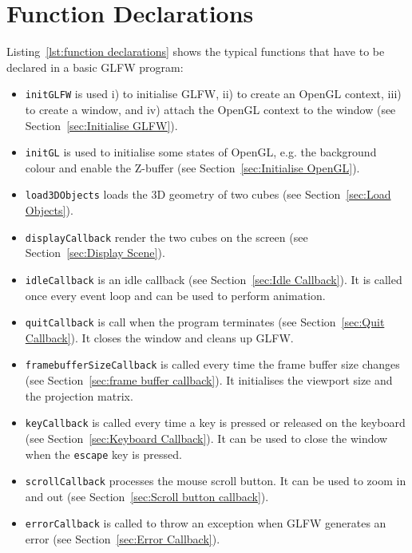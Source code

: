 \documentclass[11pt,oneside,a4paper,final]{article}
\begin{document}
\begin{center}

\end{center}


\section{Function Declarations}
\label{sec:Function Declarations}

Listing~\ref{lst:function declarations} shows the typical functions 
that have to be declared in a basic GLFW program:
\begin{itemize}
 \item \verb+initGLFW+ is used i) to initialise GLFW, ii) to create an OpenGL 
	context, iii) to create a window, and iv) attach the OpenGL context to the 
	window (see Section~\ref{sec:Initialise GLFW}).
 \item \verb+initGL+ is used to initialise some states of OpenGL, e.g. the 
	background colour and enable the Z-buffer (see 
	Section~\ref{sec:Initialise OpenGL}).
 \item \verb+load3DObjects+ loads the 3D geometry of two cubes (see 
	Section~\ref{sec:Load Objects}).
 \item \verb+displayCallback+ render the two cubes on the screen (see 
	Section~\ref{sec:Display Scene}).
 \item \verb+idleCallback+ is an idle callback 
	(see Section~\ref{sec:Idle Callback}). It is called once every event 
	loop and can be used to perform animation.
 \item \verb+quitCallback+ is call when the program terminates  (see 
	Section~\ref{sec:Quit Callback}). It closes the window and cleans up 
	GLFW.
 \item \verb+framebufferSizeCallback+ is called every time the frame buffer 
	size changes (see Section~\ref{sec:frame buffer callback}). It initialises 
	the viewport size and the projection matrix.
 \item \verb+keyCallback+ is called every time a key is pressed or released on 
	the keyboard (see Section~\ref{sec:Keyboard Callback}). It can be used to 
	close the window when the \verb+escape+ key is pressed.
\item \verb+scrollCallback+ processes the mouse scroll button. It can be used 
	to zoom in and out (see Section~\ref{sec:Scroll button callback}).
 \item \verb+errorCallback+ is called to throw an exception when GLFW generates 
	an error (see Section~\ref{sec:Error Callback}).
\end{itemize}
\end{document}
